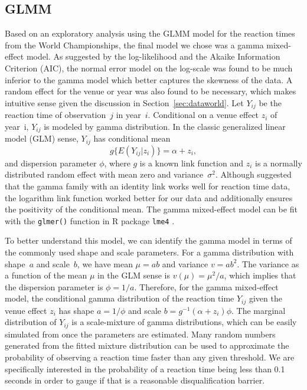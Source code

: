 \documentclass[12pt, letterpaper, titlepage]{article}
\newcommand{\jy}[1]{\textcolor{blue}{JY: #1}}
\newcommand{\eds}[1]{\textcolor{red}{EDS: (#1)}}
\begin{document}
\subsection{GLMM}\label{sec:glmm}
Based on an exploratory analysis using the GLMM model for the reaction times
from the World Championships, the final model we chose was a gamma mixed-effect 
model. As suggested by the log-likelihood and the Akaike Information
Criterion (AIC), the normal error model on the log-scale was found to be
much inferior to the gamma model which better captures the skewness of the
data. A random effect for the venue or year was also found to be necessary, 
which makes intuitive sense given the discussion in Section~\ref{sec:dataworld}. 
Let $Y_{ij}$ be the reaction time of observation~$j$ in year~$i$.
Conditional on a venue effect $z_i$ of year~i,  $Y_{ij}$ is modeled by 
gamma distribution. In the classic generalized linear model (GLM) sense,
$Y_{ij}$ has conditional mean
\[
g\{E(Y_{ij} | z_i)\} = \alpha + z_i,
\]
and dispersion parameter $\phi$, where $g$ is a known link function and
$z_i$ is a normally distributed random effect with mean zero and
variance~$\sigma^2$. Although \citet{lo2015idlink} suggested that the gamma 
family with an identity link works well for reaction time data, the logarithm 
link function worked better for our data and additionally ensures the positivity
of the conditional mean. The gamma mixed-effect model can be fit with the 
\texttt{glmer()} function in R package \texttt{lme4} \citep{lme4}.


To better understand this model, we can identify the gamma model in terms of the
commonly used shape and scale parameters. For a gamma distribution with
shape~$a$ and scale~$b$, we have mean $\mu = ab$ and variance $v = ab^2$. The
variance as a function of the mean $\mu$ in the GLM sense is
$v(\mu) = \mu^2 / a$, which implies that the dispersion parameter is
$\phi = 1 / a$. Therefore, for the gamma mixed-effect model, the conditional
gamma distribution of the reaction time $Y_{ij}$ given the venue effect $z_i$
has shape $a = 1 / \phi$ and scale $b = g^{-1}(\alpha + z_i) \phi$. The marginal
distribution of $Y_{ij}$ is a scale-mixture of gamma distributions, which can be
easily simulated from once the parameters are estimated. Many
random numbers generated from the fitted mixture distribution can be used to
approximate the probability of observing a reaction time faster than any given
threshold.  We are specifically interested in the probability of a reaction time
 being less than 0.1 seconds in order to gauge if that is a reasonable 
disqualification barrier.
\end{document}
